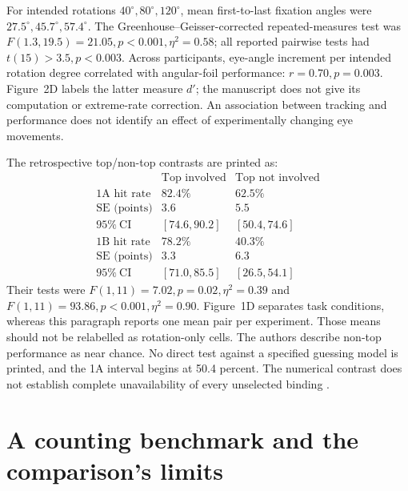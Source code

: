 For intended rotations \(40^\circ,80^\circ,120^\circ\),
mean first-to-last fixation angles were
\(27.5^\circ,45.7^\circ,57.4^\circ\).
The Greenhouse--Geisser-corrected repeated-measures test was
\(F(1.3,19.5)=21.05,p<0.001,\eta^2=0.58\);
all reported pairwise tests had \(t(15)>3.5,p<0.003\).
Across participants, eye-angle increment per intended rotation
degree correlated with angular-foil performance:
\(r=0.70,p=0.003\).
Figure~2D labels the latter measure \(d'\); the manuscript
does not give its computation or extreme-rate correction.
An association between tracking and performance does not
identify an effect of experimentally changing eye movements.

The retrospective top/non-top contrasts are printed as:
\[
\begin{array}{l|rr}
&\text{Top involved}&\text{Top not involved}\\\hline
\text{1A hit rate}&82.4\%&62.5\%\\
\mathrm{SE}\text{ (points)}&3.6&5.5\\
95\%\ \mathrm{CI}&[74.6,90.2]&[50.4,74.6]\\
\text{1B hit rate}&78.2\%&40.3\%\\
\mathrm{SE}\text{ (points)}&3.3&6.3\\
95\%\ \mathrm{CI}&[71.0,85.5]&[26.5,54.1]
\end{array}
\]
Their tests were \(F(1,11)=7.02,p=0.02,\eta^2=0.39\)
and \(F(1,11)=93.86,p<0.001,\eta^2=0.90\).
Figure~1D separates task conditions, whereas this paragraph
reports one mean pair per experiment. Those means should not
be relabelled as rotation-only cells.
The authors describe non-top performance as near chance.
No direct test against a specified guessing model is printed,
and the 1A interval begins at 50.4 percent. The numerical
contrast does not establish complete unavailability of every
unselected binding
\cite[Experiment~2; Figs.~1D and 2]{XuFranconeri2015FeatureCapacity}.

\section{A counting benchmark and the comparison's limits}
\label{sec:p19-rotation-capacity-benchmark}

